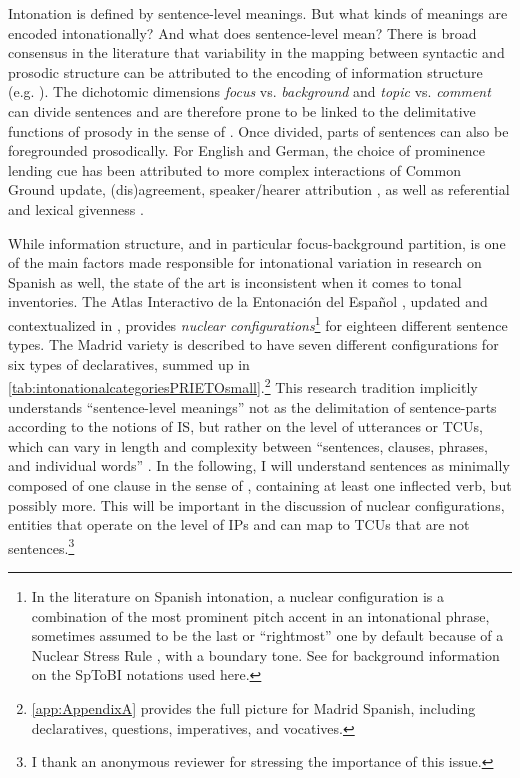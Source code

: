 Intonation is defined by sentence-level meanings. But what kinds of meanings are encoded intonationally? And what does sentence-level mean? There is broad consensus in the literature that variability in the mapping between syntactic and prosodic structure can be attributed to the encoding of information structure (e.g. \cite{Selkirk.2011,Buring.2016}). The di\-cho\-to\-mic dimensions \textit{focus} vs. \textit{background} and \textit{topic} vs. \textit{comment} can divide sentences and are therefore prone to be linked to the delimitative functions of prosody in the sense of \citet[29]{Trubeckoj1939}. Once divided, parts of sentences can also be foregrounded prosodically. For English and German, the choice of prominence lending cue has been attributed to more complex interactions of Common Ground update, (dis)agreement, speaker/hearer attribution \citep{Steedman.2007,Steedman.2014}, as well as referential and lexical givenness \citep{Baumann2006,BaumannRiester2012}.

While information structure, and in particular focus-background partition, is one of the main factors made responsible for intonational variation in research on Spanish as well, the state of the art is inconsistent when it comes to tonal inventories. The Atlas Interactivo de la Entonación del Español \citep{Prieto2009-2013}, updated and contextualized in 
\citet{HualdePrieto2015}, provides \textit{nuclear configurations}\footnote{In the literature on Spanish intonation, a nuclear configuration is a combination of the most prominent pitch accent in an intonational phrase, sometimes assumed to be the last or “rightmost” one by default because of a Nuclear Stress Rule \citep{ChomskyHalle.1968}, with a boundary tone. See  for background information on the \ac{SpToBI} notations used here.} for eighteen different sentence types. The Madrid variety is described to have seven different configurations for six types of declaratives, summed up in  \autoref{tab:intonationalcategoriesPRIETOsmall}.\footnote{\autoref{app:AppendixA} provides the full picture for Madrid Spanish, including declaratives, questions, imperatives, and vocatives.} This research tradition implicitly understands ``sen\-tence-level meanings'' not as the delimitation of sentence-parts according to the notions of \ac{IS}, but rather on the level of utterances or \acp{TCU}, which can vary in length and complexity between ``sentences, clauses, phrases, and individual words'' \citep[151]{Clayman.2013}. In the following, I will understand sentences as minimally composed of one clause in the sense of \citet[77]{BrownMiller.2013}, containing at least one inflected verb, but possibly more. This will be important in the discussion of nuclear configurations, entities that operate on the level of \acp{IP} and can map to \acp{TCU} that are not sentences.\footnote{I thank an anonymous reviewer for stressing the importance of this issue.}

